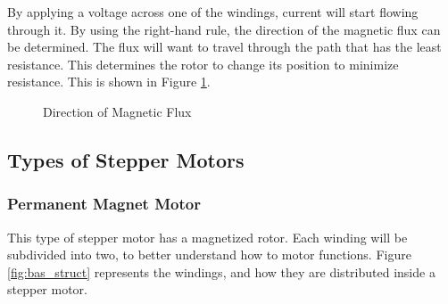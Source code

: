 By applying a voltage across one of the windings, current will start flowing through it. By using the right-hand rule, the direction of the magnetic flux can be determined. The flux will want to travel through the path that has the least resistance. This determines the rotor to change its position to minimize resistance. This is shown in Figure \ref{fig:flux}.

\begin{figure}[htp]
	\centering
	\hfill
	\caption{Direction of Magnetic Flux}
	\label{fig:flux}
\end{figure}

\subsection{Types of Stepper Motors}
\subsubsection{Permanent Magnet Motor}
This type of stepper motor has a magnetized rotor. Each winding will be subdivided into two, to better understand how to motor functions. Figure \ref{fig:bas_struct} represents the windings, and how they are distributed inside a stepper motor.

